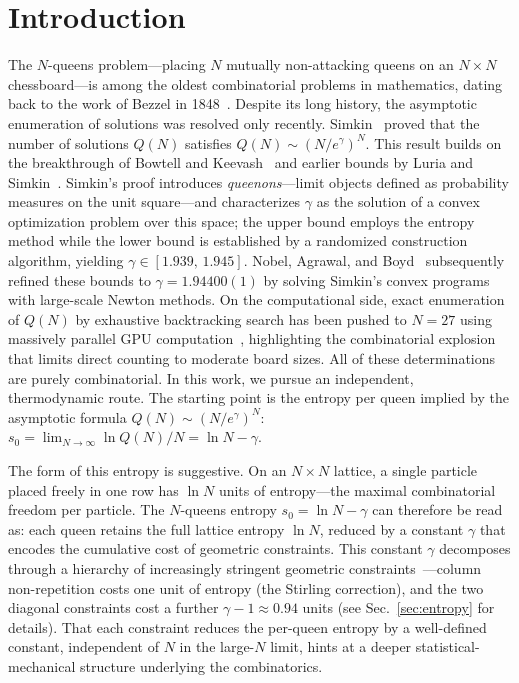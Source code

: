 \documentclass[aps, pre, reprint, amsmath, amssymb, superscriptaddress, floatfix]{revtex4-2}
\begin{document}
\maketitle


\section{Introduction}
\label{sec:intro}

The $N$-queens problem---placing $N$ mutually non-attacking queens on
an $N \times N$ chessboard---is among the oldest combinatorial
problems in mathematics, dating back to the work of Bezzel in
1848~\cite{Bezzel1848}.  Despite its long history, the asymptotic
enumeration of solutions was resolved only recently.  Simkin~\cite{Simkin2022}
proved that the number of solutions $Q(N)$ satisfies
$Q(N) \sim (N/e^{\gamma})^N$.
This result builds on the breakthrough of Bowtell and
Keevash~\cite{Bowtell2023} and earlier bounds by Luria and
Simkin~\cite{Luria2021}.  Simkin's proof introduces \emph{queenons}---limit
objects defined as probability measures on the unit square---and
characterizes $\gamma$ as the solution of a convex optimization
problem over this space; the upper bound employs the entropy method
while the lower bound is established by a randomized construction
algorithm, yielding $\gamma \in [1.939,\, 1.945]$.
Nobel, Agrawal, and Boyd~\cite{Nobel2023} subsequently refined these
bounds to $\gamma = 1.94400(1)$ by solving
Simkin's convex programs with large-scale Newton methods.
On the computational side, exact enumeration of $Q(N)$ by exhaustive
backtracking search has been pushed to $N = 27$ using massively
parallel GPU computation~\cite{Yao2025}, highlighting the
combinatorial explosion that limits direct counting to moderate board
sizes.
All of these determinations are purely combinatorial.
In this work, we pursue an independent, thermodynamic route.
The starting point is the entropy per queen implied by the
asymptotic formula $Q(N) \sim (N/e^\gamma)^N$:
$s_0 = \lim_{N \to \infty} \ln Q(N)/N = \ln N - \gamma$.

The form of this entropy is suggestive.  On an
$N \times N$ lattice, a single particle placed freely in one row has
$\ln N$ units of entropy---the maximal combinatorial freedom per
particle.  The $N$-queens entropy $s_0 = \ln N - \gamma$ can
therefore be read as: each queen retains the full lattice entropy
$\ln N$, reduced by a constant $\gamma$ that encodes the cumulative
cost of geometric constraints.  This constant $\gamma$ decomposes
through a hierarchy of increasingly stringent geometric
constraints~\cite{Knuth2022}---column non-repetition costs one unit
of entropy (the Stirling correction), and the two diagonal constraints
cost a further $\gamma - 1 \approx 0.94$ units
(see Sec.~\ref{sec:entropy} for details).
That each constraint reduces the per-queen entropy by a well-defined
constant, independent of $N$ in the large-$N$ limit, hints at a
deeper statistical-mechanical structure underlying the combinatorics.
\end{document}
